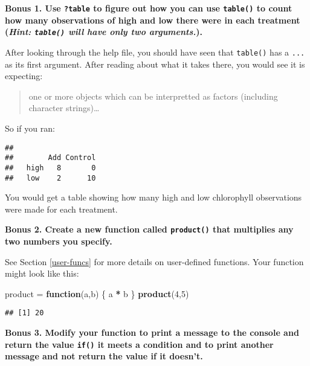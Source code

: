 \documentclass[]{book}
\newenvironment{Shaded}{\begin{snugshade}}{\end{snugshade}}
\newcommand{\KeywordTok}[1]{\textcolor[rgb]{0.13,0.29,0.53}{\textbf{#1}}}
\newcommand{\DecValTok}[1]{\textcolor[rgb]{0.00,0.00,0.81}{#1}}
\newcommand{\StringTok}[1]{\textcolor[rgb]{0.31,0.60,0.02}{#1}}
\newcommand{\ControlFlowTok}[1]{\textcolor[rgb]{0.13,0.29,0.53}{\textbf{#1}}}
\newcommand{\OperatorTok}[1]{\textcolor[rgb]{0.81,0.36,0.00}{\textbf{#1}}}
\newcommand{\NormalTok}[1]{#1}
\theoremstyle{definition}
\theoremstyle{definition}
\theoremstyle{definition}
\theoremstyle{remark}
\begin{document}
\textbf{Bonus 1. Use \texttt{?table} to figure out how you can use
\texttt{table()} to count how many observations of high and low there
were in each treatment (\emph{Hint: \texttt{table()} will have only two
arguments.}).}

After looking through the help file, you should have seen that
\texttt{table()} has a \texttt{...} as its first argument. After reading
about what it takes there, you would see it is expecting:

\begin{quote}
one or more objects which can be interpretted as factors (including
character strings)\ldots{}
\end{quote}

So if you ran:

\begin{Shaded}
\end{Shaded}

\begin{verbatim}
##       
##        Add Control
##   high   8       0
##   low    2      10
\end{verbatim}

You would get a table showing how many high and low chlorophyll
observations were made for each treatment.

\textbf{Bonus 2. Create a new function called \texttt{product()} that
multiplies any two numbers you specify.}

See Section \ref{user-funcs} for more details on user-defined functions.
Your function might look like this:

\begin{Shaded}
\begin{Highlighting}[]
\NormalTok{product =}\StringTok{ }\ControlFlowTok{function}\NormalTok{(a,b) \{}
\NormalTok{  a }\OperatorTok{*}\StringTok{ }\NormalTok{b}
\NormalTok{\}}
\KeywordTok{product}\NormalTok{(}\DecValTok{4}\NormalTok{,}\DecValTok{5}\NormalTok{)}
\end{Highlighting}
\end{Shaded}

\begin{verbatim}
## [1] 20
\end{verbatim}

\textbf{Bonus 3. Modify your function to print a message to the console
and return the value \texttt{if()} it meets a condition and to print
another message and not return the value if it doesn't.}
\end{document}
